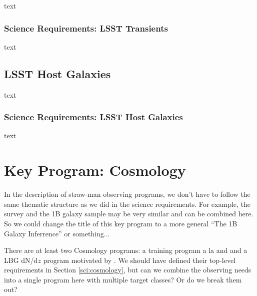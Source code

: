 \documentclass[11pt,a4paper,twoside,onecolumn,openany,final,oldfontcommands]{memoir}
\begin{document}
text

\subsection{Science Requirements: LSST Transients}

\begin{sciencerequirement}

\reqitem text
\end{sciencerequirement}

\section{LSST Host Galaxies}

text

\subsection{Science Requirements: LSST Host Galaxies}

\begin{sciencerequirement}

\reqitem text
\end{sciencerequirement}


\newpage



\chapter{Key Program: Cosmology}\label{prog:cosmology}

In the description of straw-man observing programs, we don't have to follow the same thematic structure as we did in the science requirements.  For example, the \photoz{} survey and the 1B galaxy sample may be very similar and can be combined here.  So we could change the title of this key program to a more general ``The 1B Galaxy Inferrence'' or something...

There are at least two Cosmology programs: a \photoz{} training program a la \citet{newman15} and \citet{hemmati18} and a LBG dN/d$z$ program motivated by \citet{wilson19}.  We should have defined their top-level requirements in Section \ref{sci:cosmology}, but can we combine the observing needs into a single program here with multiple target classes?  Or do we break them out?
\end{document}
